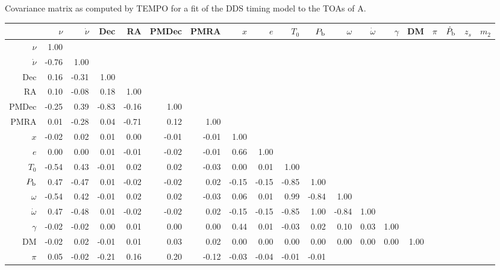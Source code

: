 \documentclass[12pt,psfig]{article}
\begin{document}
\clearpage
\bigskip
{}
Covariance matrix as computed by TEMPO for a fit of the DDS timing
model to the TOAs of A.

\begin{table}[ht]
\begin{center}
\tiny
\begin{tabular}{r|rrrrrrrrrrrrrrrrrr}
       &     $\nu$ & $\dot{\nu}$  & Dec  &  RA & PMDec & PMRA & $x$ & $e$ &
       $T_0$ & $P_{\rm b}$ & $\omega$ & $\dot\omega$ & $\gamma$ &  DM & $\pi$
       & $\dot{P}_{\rm b}$ & $z_s$ & $m_2$ \\  
\hline
   $\nu$&    1.00 & & & & & & & & & & & & & & & & & \\ 
   $\dot\nu$&  -0.76 & 1.00 & & & & & & & & & & & & & & & & \\
    Dec&   0.16 & -0.31 &   1.00 & & & & & & & & & & & & & & & \\
     RA&   0.10 & -0.08 & 0.18 & 1.00 & & & & & & & & & & & & & & \\
   PMDec&  -0.25 &  0.39 & -0.83 & -0.16 &  1.00 & & & & & & & & & & & & & \\
   PMRA&   0.01 & -0.28&  0.04& -0.71&  0.12&  1.00 & & & & & & & & & & & & \\
   $x$ &  -0.02 & 0.02 & 0.01&  0.00& -0.01& -0.01&  1.00& & & & & & & & & & & \\
   $e$&   0.00 & 0.00 & 0.01& -0.01& -0.02& -0.01&  0.66&  1.00& & & & & & & &
       & & \\
   $T_0$&  -0.54 & 0.43 &-0.01 & 0.02 & 0.02& -0.03&  0.00&  0.01&  1.00 & & & &
       & & & & & \\
   $P_{\rm b}$&   0.47&  -0.47&  0.01 &-0.02& -0.02&  0.02& -0.15& -0.15& -0.85&
       1.00& & & & & & & & \\
  $\omega$&  -0.54 & 0.42& -0.01 & 0.02 & 0.02& -0.03 & 0.06 & 0.01&  0.99& -0.84
       & 1.00 & & & & & & & \\
  $\dot\omega$&   0.47& -0.48 & 0.01 &-0.02& -0.02&  0.02& -0.15 &-0.15& -0.85 & 1.00&
       -0.84&  1.00& & & & & & \\
  $\gamma$&  -0.02& -0.02&  0.00&  0.01 & 0.00&  0.00&  0.44&  0.01& -0.03&  0.02
       & 0.10 & 0.03&  1.00& & & & & \\
     DM&  -0.02 & 0.02& -0.01&  0.01&  0.03 & 0.02&  0.00&  0.00&  0.00&  0.00&
       0.00&  0.00&  0.00&  1.00& & & & \\
   $\pi$&   0.05& -0.02& -0.21&  0.16&  0.20& -0.12& -0.03& -0.04& -0.01& -0.01&

\end{tabular}
\end{center}
\end{table}
\end{document}
